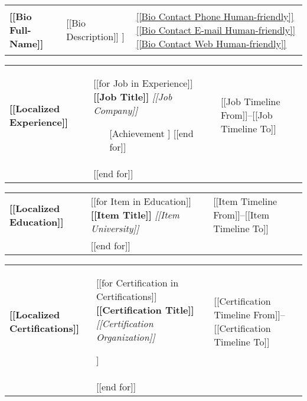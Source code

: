 \documentclass[11pt, a4paper]{article}
\begin{document}
\begin{tabularx}{\textwidth}{m{50mm} m{95mm} m{50mm}}
    {\huge\textbf{[[Bio Full-Name]]}} \newline &
    \begin{center}
    [[Bio Description]] \newline
    [[Bio Location]] \newline
    \end{center} &
    {\small \underline{\href{[[Bio Contact Phone URI]]}{[[Bio Contact Phone Human-friendly]]}}} \newline
    {\small \underline{\href{[[Bio Contact E-mail URI]]}{[[Bio Contact E-mail Human-friendly]]}}} \newline
    {\small \underline{\href{[[Bio Contact Web URI]]}{[[Bio Contact Web Human-friendly]]}}} \newline
\end{tabularx}

\begin{tabularx}{\textwidth}{p{20mm} p{125mm} p{50mm}}
    \textbf{[[Localized Experience]]} &
    [[for Job in Experience]]
        \textbf{[[Job Title]]} \newline
        \textit{[[Job Company]]}
        \begin{itemize}[leftmargin=*]
        [[for Achievement in Job Achievements]]
            \item [[Achievement]]
        [[end for]]
        \end{itemize} &
        {\small [[Job Timeline From]]--[[Job Timeline To]]} \\ &
    [[end for]]
\end{tabularx}

\begin{tabularx}{\textwidth}{p{20mm} p{125mm} p{50mm}}
    \textbf{[[Localized Education]]} &
    [[for Item in Education]]
        \textbf{[[Item Title]]} \newline
        \textit{[[Item University]]} \newline &
        {\small [[Item Timeline From]]--[[Item Timeline To]]} \\ &
    [[end for]]
\end{tabularx}

\begin{tabularx}{\textwidth}{p{20mm} p{125mm} p{50mm}}
    \textbf{[[Localized Certifications]]} &
    [[for Certification in Certifications]]
        \textbf{[[Certification Title]]} \newline
        \textit{[[Certification Organization]]}
        \begin{flushleft}
        [[Certification Description]]
        \end{flushleft} &
        {\small [[Certification Timeline From]]--[[Certification Timeline To]]} \\ &
    [[end for]]
\end{tabularx}
\end{document}
